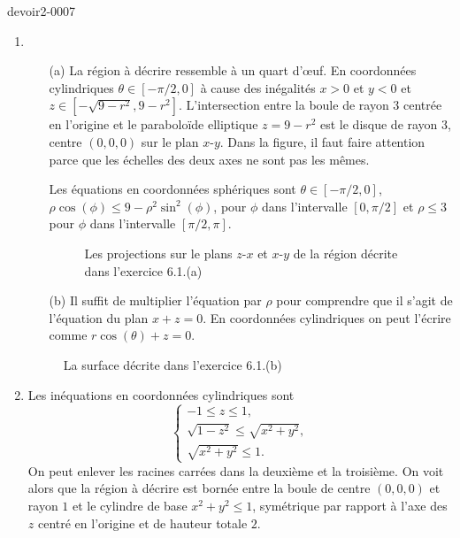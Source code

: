 \begin{corrige}{devoir2-0007}
  \begin{enumerate}
  \item 
    \begin{enumerate}
    \item[(a)] La région à décrire ressemble à un quart d'œuf. En coordonnées cylindriques $\theta\in [-\pi/2, 0]$ à cause des inégalités $x>0$ et $y<0$ et $z\in [-\sqrt{9-r^2}, 9-r^2]$. L'intersection entre la  boule de rayon $3$ centrée en l'origine et le paraboloïde elliptique $z=9-r^2$ est le disque de  rayon $3$, centre $(0,0,0)$ sur le plan $x$-$y$. Dans la figure, il faut faire attention parce que les échelles des deux axes ne sont pas les mêmes. 

      Les équations en coordonnées sphériques sont $\theta\in [-\pi/2, 0]$, $\rho\cos(\phi)\leq 9- \rho^2\sin^2(\phi)$, pour $\phi$ dans l'intervalle $[0, \pi/2]$ et $\rho\leq 3$ pour  $\phi$ dans l'intervalle $[\pi/2, \pi]$.
 \begin{figure}
  \begin{center}

  \caption{Les projections sur le plans $z$-$x$ et $x$-$y$ de la région décrite dans l'exercice 6.1.(a)}\label{exo6devoir2}
  \end{center}
 
  \end{figure}
    \item[(b)] Il suffit de multiplier l'équation par $\rho$ pour comprendre que il s'agit de l'équation du plan $x+z=0$. En coordonnées cylindriques on peut l'écrire comme $r\cos(\theta)+z=0$. 
    \end{enumerate}

\begin{figure}
  \begin{center}

  \caption{La surface décrite dans l'exercice 6.1.(b)}\label{exo6devoir2un}
  \end{center}
 
  \end{figure}

  \item Les inéquations en coordonnées cylindriques sont 
    \begin{equation}
      \begin{cases}
        -1\leq z\leq 1,\\
        \sqrt{1-z^2}\leq\sqrt{x^2+y^2},\\
        \sqrt{x^2+y^2}\leq 1.
      \end{cases}
    \end{equation}
    On peut enlever les racines carrées dans la deuxième et la troisième. On voit alors que la région à décrire est bornée entre la boule de centre $(0,0,0)$ et rayon  $1$ et le cylindre de base $x^2+y^2\leq 1$, symétrique par rapport à l'axe des $z$ centré en l'origine et de hauteur totale $2$.  
  \end{enumerate}


\end{corrige}

